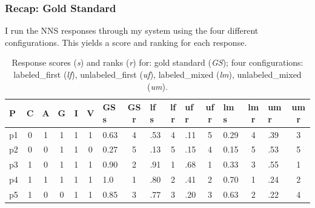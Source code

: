 \documentclass[xcolor={dvipsnames}]{beamer}
\begin{document}
\begin{frame}
\frametitle{Recap: Gold Standard}
\scriptsize
I run the NNS responses through my system using the four different configurations. This yields a score and ranking for each response.
\begingroup
\setlength{\tabcolsep}{4pt} %
\begin{table}
\tiny
\begin{center}
\begin{tabular}{|l||c|c|c|c|c||l|c||l|c||l|c||l|c||l|c|}
\hline
P & C & A & G & I & V & \tiny{GS s} & \tiny{GS r} & \tiny{lf s} & \tiny{lf r} & \tiny{uf r} & \tiny{uf r} & \tiny{lm s} & \tiny{lm r} & \tiny{um r} & \tiny{um r} \\
\hline
p1 & 0 & 1 & 1 & 1 & 1 & 0.63 & 4 & .53 & 4 & .11 & 5 & 0.29 & 4 & .39 & 3 \\
\hline
p2 & 0 & 0 & 1 & 1 & 0 & 0.27 & 5 & .13 & 5 & .15 & 4 & 0.15 & 5 & .53 & 5 \\
\hline
p3 & 1 & 0 & 1 & 1 & 1 & 0.90 & 2 & .91 & 1 & .68 & 1 & 0.33 & 3 & .55 & 1 \\
\hline
p4 & 1 & 1 & 1 & 1 & 1 & 1.0 & 1 & .80 & 2 & .41 & 2 & 0.70 & 1 & .24 & 2 \\
\hline
p5 & 1 & 0 & 0 & 1 & 1 & 0.85 & 3 & .77 & 3 & .20 & 3 & 0.63 & 2 & .22 & 4 \\
\hline
\end{tabular}
\caption{\label{tab:modelranks} \scriptsize Response scores (\textit{s}) and ranks (\textit{r}) for: gold standard (\textit{GS}); four configurations: labeled\_first (\textit{lf}), unlabeled\_first (\textit{uf}), labeled\_mixed (\textit{lm}), unlabeled\_mixed (\textit{um}).}
\end{center}
\end{table}
\endgroup
\end{frame}
\end{document}
